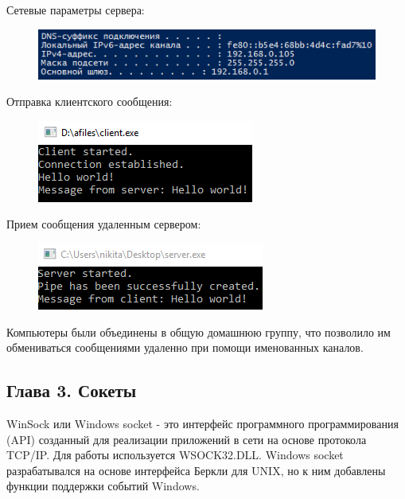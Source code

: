 \documentclass[14pt,a4paper,report]{report}
\begin{document}
Сетевые параметры сервера:

\begin{figure}[h!]
	\centering
	\includegraphics[scale = 0.85]{images/p2_3_server_config.png}
	
	\caption{}
	\label{image:7}
\end{figure}

Отправка клиентского сообщения:

\begin{figure}[h!]
	\centering
	\includegraphics[scale = 0.90]{images/p2_3_client_result.png}
	
	\caption{}
	\label{image:8}
\end{figure}

Прием сообщения удаленным сервером:

\begin{figure}[h!]
	\centering
	\includegraphics[scale = 0.90]{images/p2_3_server_result.png}
	
	\caption{}
	\label{image:9}
\end{figure}

Компьютеры были объединены в общую домашнюю группу, что позволило им обмениваться сообщениями удаленно при помощи именованных каналов.

\subsection{Глава 3. Сокеты}

WinSock или Windows socket - это интерфейс программного программирования (API) созданный для реализации приложений в сети на основе протокола TCP/IP. Для работы используется WSOCK32.DLL. Windows socket разрабатывался на основе интерфейса Беркли для UNIX, но к ним добавлены функции поддержки событий Windows.
\end{document}
